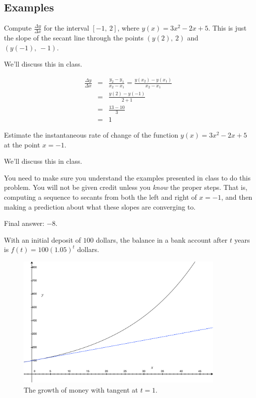 \documentclass[12pt,addpoints, answers, fleqn]{exam}
\begin{document}
\subsection{Examples}
\begin{questions}
\question Compute $\displaystyle \frac{\Delta y}{\Delta x}$  for the interval $\left[-1,\ 2\right]$, where $y\left( x \right) = 3x^2 - 2x + 5$. This is just the slope of the secant line through the points $\left( y\left( 2 \right), \ 2 \right)$ and $\left( y\left( -1 \right), \ -1 \right)$.

\begin{solution}
We'll discuss this in class.

\begin{eqnarray*}
\frac{\Delta y}{\Delta x} &=& \frac{y_2 - y_1}{x_2-x_1} = \frac{y\left(x_2\right) - y\left(x_1\right)}{x_2-x_1}\\
&=& \frac{y\left(2\right) - y\left(-1\right)}{2+1}\\
&=& \frac{13 - 10}{3}\\
&=&1
\end{eqnarray*}
\end{solution}

\question Estimate the instantaneous rate of change of the function $y\left( x \right) = 3x^2 - 2x + 5$ at the point $x = -1$.
\begin{solution}
We'll discuss this in class.

You need to make sure you understand the examples presented in class to do this problem. You will not be given credit unless you \emph{know} the proper steps. That is, computing a sequence to secants from both the left and right of $x=-1$, and then making a prediction about what these slopes are converging to.

Final answer: $-8$.
\end{solution}

\question With an initial deposit of $100$ dollars, the balance in a bank account after $t$ years is $f\left(t\right) = 100\left(1.05\right)^t$ dollars.
\begin{figure}[htbp] %
   \centering
   \includegraphics[width=4in]{./graphics/graph_money.pdf} 
   \caption{The growth of money with tangent at $t=1$.}
   \label{fig:graph_money}
\end{figure}
\begin{parts}

\end{parts}
\end{questions}
\end{document}
